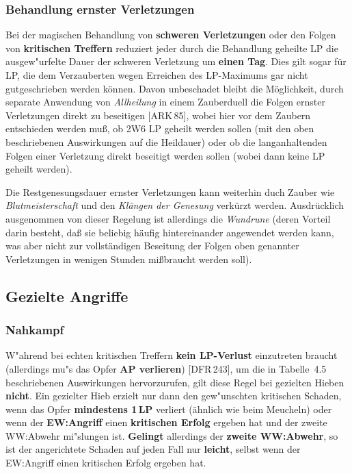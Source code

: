 \documentclass[10pt,a4paper,germanpar]{article}
\begin{document}
\subsubsection{Behandlung ernster Verletzungen}

Bei der magischen Behandlung von \textbf{schweren Verletzungen} oder
den Folgen von \textbf{kritischen Treffern} reduziert jeder durch die
Behandlung geheilte LP die ausgew"urfelte Dauer der schweren
Verletzung um \textbf{einen Tag}. Dies gilt sogar für LP, die dem
Verzauberten wegen Erreichen des LP-Maximums gar nicht gutgeschrieben
werden können. Davon unbeschadet bleibt die Möglichkeit, durch
separate Anwendung von \emph{Allheilung} in einem Zauberduell die
Folgen ernster Verletzungen direkt zu beseitigen [ARK\,85], wobei
hier vor dem Zaubern entschieden werden muß, ob 2W6 LP geheilt werden
sollen (mit den oben beschriebenen Auswirkungen auf die Heildauer)
oder ob die langanhaltenden Folgen einer Verletzung direkt beseitigt
werden sollen (wobei dann keine LP geheilt werden).

Die Restgenesungsdauer ernster Verletzungen kann weiterhin duch Zauber
wie \emph{Blutmeisterschaft} und den \emph{Klän\-gen der Genesung}
verkürzt werden. Ausdrücklich ausgenommen von dieser Regelung ist
allerdings die \emph{Wundrune} (deren Vorteil darin besteht, daß sie
beliebig häufig hintereinander angewendet werden kann, was aber nicht
zur vollständigen Beseitung der Folgen oben genannter Verletzungen in
wenigen Stunden mißbraucht werden soll).


\subsection{Gezielte Angriffe}
\label{gezielt}

\subsubsection{Nahkampf}

W"ahrend bei echten kritischen Treffern \textbf{kein LP-Verlust}
einzutreten braucht (allerdings mu"s das Opfer \textbf{AP verlieren})
[DFR\,243], um die in Tabelle~4.5 beschriebenen Auswirkungen
hervorzurufen, gilt diese Regel bei gezielten Hieben
\textbf{nicht}. Ein gezielter Hieb erzielt nur dann den gew"unschten
kritischen Schaden, wenn das Opfer \textbf{mindestens 1\,LP} verliert
(ähnlich wie beim Meucheln) oder wenn der \textbf{EW:Angriff} einen
\textbf{kritischen Erfolg} ergeben hat und der zweite WW:Abwehr
mi"slungen ist. \textbf{Gelingt} allerdings der \textbf{zweite
  WW:Abwehr}, so ist der angerichtete Schaden auf jeden Fall nur
\textbf{leicht}, selbst wenn der EW:Angriff einen kritischen Erfolg
ergeben hat.
\end{document}
